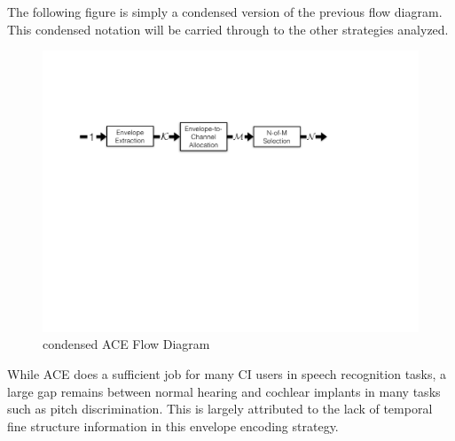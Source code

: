 \documentclass [11pt, proquest,oneside] {uwthesis}[2015/03/03]
\begin{document}
The following figure is simply a condensed version of the previous flow diagram.  This condensed notation will be carried through to the other strategies analyzed.

\begin{figure}[!ht]
  \centering
    \includegraphics[width=1\textwidth]{ACE_flow_diagram}   
    \caption{condensed ACE Flow Diagram}\label{fig:ace_flow_diagram}
\end{figure}

While ACE does a sufficient job for many CI users in speech recognition tasks, a large gap remains between normal hearing and cochlear implants in many tasks such as pitch discrimination.  This is largely attributed to the lack of temporal fine structure information in this envelope encoding strategy.


\end{document}

